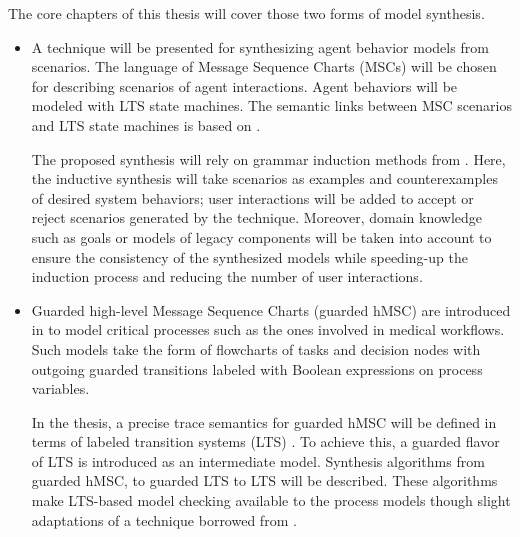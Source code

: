 The core chapters of this thesis will cover those two forms of model synthesis.
\begin{itemize}
\item A technique will be presented for synthesizing agent behavior models from scenarios. The language of Message Sequence Charts (MSCs) will be chosen for describing scenarios of agent interactions. Agent behaviors will be modeled with LTS state machines. The semantic links between MSC scenarios and LTS state machines is based on \cite{Uchitel:2003}.

The proposed synthesis will rely on grammar induction methods from \cite{Oncina:1992, Lang:1998}. Here, the inductive synthesis will take scenarios as examples and counterexamples of desired system behaviors; user interactions will be added to accept or reject scenarios generated by the technique. Moreover, domain knowledge such as goals or models of legacy components will be taken into account to ensure the consistency of the synthesized models while speeding-up the induction process and reducing the number of user interactions.

\item Guarded high-level Message Sequence Charts (guarded hMSC) are introduced in \cite{Damas:2010, Damas:2011} to model critical processes such as the ones involved in medical workflows. Such models take the form of flowcharts of tasks and decision nodes with outgoing guarded transitions labeled with Boolean expressions on process variables. 

In the thesis, a precise trace semantics for guarded hMSC will be defined in terms of labeled transition systems (LTS) \cite{Keller:1976, Magee:1999}. To achieve this, a guarded flavor of LTS is introduced as an intermediate model. Synthesis algorithms from guarded hMSC, to guarded LTS to LTS will be described. These algorithms make LTS-based model checking available to the process models though slight adaptations of a technique borrowed from \cite{Giannakopoulou:2003}.
\end{itemize}

